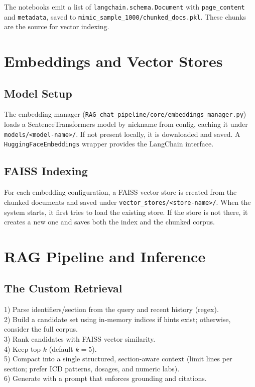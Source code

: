 \noindent The notebooks emit a list of \texttt{langchain.schema.Document} with \texttt{page\_content} and \texttt{metadata}, saved to \texttt{mimic\_sample\_1000/chunked\_docs.pkl}. These chunks are the source for vector indexing.

\section{Embeddings and Vector Stores}

\subsection{Model Setup}
The embedding manager (\texttt{RAG\_chat\_pipeline/core/embeddings\_manager.py}) loads a SentenceTransformers model by nickname from config, caching it under \texttt{models/<model-name>/}. If not present locally, it is downloaded and saved. A \texttt{HuggingFaceEmbeddings} wrapper provides the LangChain interface.

\subsection{FAISS Indexing}
For each embedding configuration, a FAISS vector store is created from the chunked documents and saved under \texttt{vector\_stores/<store-name>/}. When the system starts, it first tries to load the existing store. If the store is not there, it creates a new one and saves both the index and the chunked corpus.
\section{RAG Pipeline and Inference}

\subsection{The Custom Retrieval}
1) Parse identifiers/section from the query and recent history (regex).\\
2) Build a candidate set using in-memory indices if hints exist; otherwise, consider the full corpus.\\
3) Rank candidates with FAISS vector similarity.\\
4) Keep top-\(k\) (default \(k=5\)).\\
5) Compact into a single structured, section-aware context (limit lines per section; prefer ICD patterns, dosages, and numeric labs).\\
6) Generate with a prompt that enforces grounding and citations.

